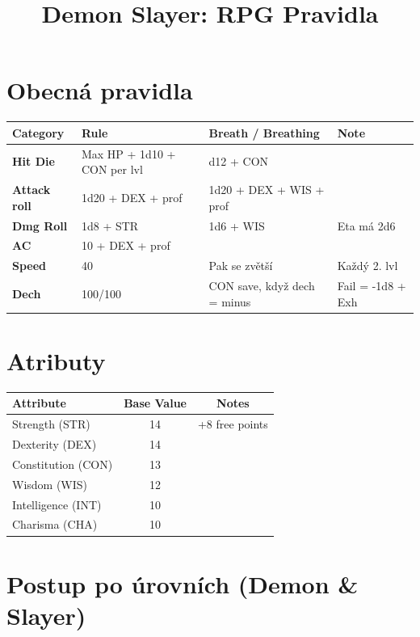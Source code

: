 \documentclass[a4paper, 10pt]{article}
\title{\vspace{-2cm}\textbf{Demon Slayer: RPG Pravidla}\vspace{-1cm}}
\date{}
\begin{document}
\maketitle

\section*{Obecná pravidla}
\begin{table}[h!]
\centering
\renewcommand{\arraystretch}{1.2}
\begin{tabularx}{\textwidth}{l l l X}
\toprule
\textbf{Category} & \textbf{Rule} & \textbf{Breath / Breathing} & \textbf{Note} \\
\midrule
\textbf{Hit Die} & Max HP + 1d10 + CON per lvl & d12 + CON & \\
\textbf{Attack roll} & 1d20 + DEX + prof & 1d20 + DEX + WIS + prof & \\
\textbf{Dmg Roll} & 1d8 + STR & 1d6 + WIS & Eta má 2d6 \\
\textbf{AC} & 10 + DEX + prof & & \\
\textbf{Speed} & 40 & Pak se zvětší & Každý 2. lvl \\
\textbf{Dech} & 100/100 & CON save, když dech = minus & Fail = -1d8 + Exh \\
\bottomrule
\end{tabularx}
\end{table}

\section*{Atributy}
\begin{table}[h!]
\centering
\begin{tabular}{lcc}
\toprule
\textbf{Attribute} & \textbf{Base Value} & \textbf{Notes} \\
\midrule
Strength (STR) & 14 & +8 free points \\
Dexterity (DEX) & 14 & \\
Constitution (CON) & 13 & \\
Wisdom (WIS) & 12 & \\
Intelligence (INT) & 10 & \\
Charisma (CHA) & 10 & \\
\bottomrule
\end{tabular}
\end{table}

\section*{Postup po úrovních (Demon \& Slayer)}
\end{document}
